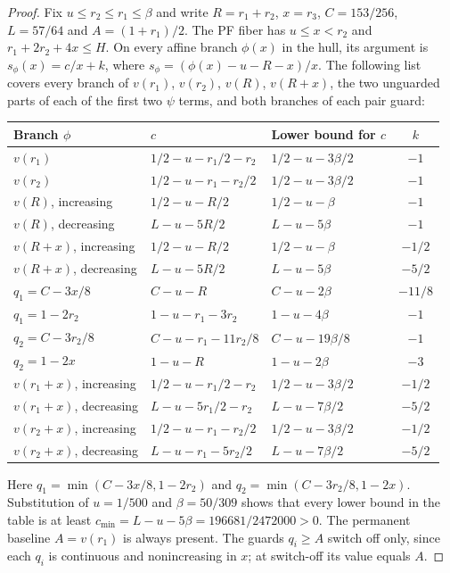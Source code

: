 \begin{proof}
Fix $u\le r_2\le r_1\le\beta$ and write $R=r_1+r_2$, $x=r_3$,
$C=153/256$, $L=57/64$ and $A=(1+r_1)/2$.
The PF fiber has $u\le x<r_2$ and $r_1+2r_2+4x\le H$.
On every affine branch $\phi(x)$ in the hull, its argument is
$s_\phi(x)=c/x+k$, where
$s_\phi=(\phi(x)-u-R-x)/x$.
The following list covers every branch of $v(r_1)$, $v(r_2)$,
$v(R)$, $v(R+x)$, the two unguarded parts of each of the first two
$\psi$ terms, and both branches of each pair guard:
\begingroup\scriptsize
\setlength{\tabcolsep}{1.5pt}
\begin{longtable}{@{}p{}p{}p{}c@{}}
\toprule
Branch $\phi$ & $c$ & Lower bound for $c$ & $k$ \\
\midrule
$v(r_1)$ & $1/2-u-r_1/2-r_2$ & $1/2-u-3\beta/2$ & $-1$ \\
$v(r_2)$ & $1/2-u-r_1-r_2/2$ & $1/2-u-3\beta/2$ & $-1$ \\
$v(R)$, increasing & $1/2-u-R/2$ & $1/2-u-\beta$ & $-1$ \\
$v(R)$, decreasing & $L-u-5R/2$ & $L-u-5\beta$ & $-1$ \\
$v(R+x)$, increasing & $1/2-u-R/2$ & $1/2-u-\beta$ & $-1/2$ \\
$v(R+x)$, decreasing & $L-u-5R/2$ & $L-u-5\beta$ & $-5/2$ \\
$q_1=C-3x/8$ & $C-u-R$ & $C-u-2\beta$ & $-11/8$ \\
$q_1=1-2r_2$ & $1-u-r_1-3r_2$ & $1-u-4\beta$ & $-1$ \\
$q_2=C-3r_2/8$ & $C-u-r_1-11r_2/8$ & $C-u-19\beta/8$ & $-1$ \\
$q_2=1-2x$ & $1-u-R$ & $1-u-2\beta$ & $-3$ \\
$v(r_1+x)$, increasing & $1/2-u-r_1/2-r_2$ & $1/2-u-3\beta/2$ & $-1/2$ \\
$v(r_1+x)$, decreasing & $L-u-5r_1/2-r_2$ & $L-u-7\beta/2$ & $-5/2$ \\
$v(r_2+x)$, increasing & $1/2-u-r_1-r_2/2$ & $1/2-u-3\beta/2$ & $-1/2$ \\
$v(r_2+x)$, decreasing & $L-u-r_1-5r_2/2$ & $L-u-7\beta/2$ & $-5/2$ \\
\bottomrule
\end{longtable}
\endgroup
Here $q_1=\min(C-3x/8,1-2r_2)$ and
$q_2=\min(C-3r_2/8,1-2x)$.
Substitution of $u=1/500$ and $\beta=50/309$ shows that every lower
bound in the table is at least
$c_{\min}=L-u-5\beta=196681/2472000>0$.
The permanent baseline $A=v(r_1)$ is always present.
The guards $q_i\ge A$ switch off only, since each $q_i$ is continuous
and nonincreasing in $x$; at switch-off its value equals $A$.

\end{proof}

